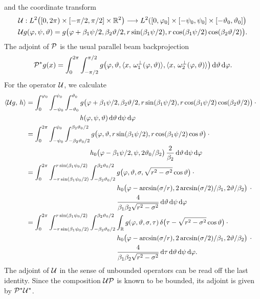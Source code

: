 \documentclass{amsart}
\renewcommand*{\phi}{\varphi}
\begin{document}
%
and the coordinate transform
%
\begin{align}
 &\OPU: L^2\big( [0, 2\pi) \times [-\pi/2, \pi/2] \times \RR^2 \big) \Lto L^2([0, \phi_0] \times [-\psi_0, \psi_0] \times 
 [-\vartheta_0, \vartheta_0] \big) \notag \\
 \label{eq:conecurved_coord_op}
 &\OPU g(\phi, \psi, \vartheta) = g\big( \phi + \beta_1\psi/2, \beta_2\vartheta/2, r\sin(\beta_1\psi/2), r \cos(\beta_1\psi/2) 
 \cos(\beta_2\vartheta/2) \big).
\end{align}
%
The adjoint of ${\mathcal{P}}$ is the usual parallel beam backprojection
%
\begin{equation}
 \label{eq:conecurved_backproj}
 \DUALOPP g(x) = \int_0^{2\pi} \int_{-\pi/2}^{\pi/2} g\big( \phi, \vartheta, \INNER{x}{\omega_1^\perp(\phi, \vartheta)}, 
 \INNER{x}{\omega_2^\perp(\phi, \vartheta)} \big)\, \D\vartheta\, \D\phi.
\end{equation} 
%
For the operator ${\mathcal{U}}$, we calculate
%
\begin{align*}
 \INNER{\OPU g}{h}
 &= \int_0^{\phi_0} \int_{-\psi_0}^{\psi_0} \int_{-\vartheta_0}^{\vartheta_0} g\big( \phi + \beta_1\psi/2, \beta_2\vartheta/2, 
 r\sin(\beta_1\psi/2), r \cos(\beta_1\psi/2) \cos(\beta_2\vartheta/2) \big) \cdot \phantom{x} \\
 &\hspace{80pt} h(\phi, \psi, \vartheta)\, \D\vartheta\, \D\psi\, \D\phi \\
 &= \int_0^{2\pi} \int_{-\psi_0}^{\psi_0} \int_{-\beta_2\vartheta_0/2}^{\beta_2\vartheta_0/2} g\big( \phi, \vartheta, 
 r\sin(\beta_1\psi/2), r \cos(\beta_1\psi/2) \cos\vartheta \big) \cdot \phantom{x} \\
 &\hspace{95pt} h_0\big( \phi - \beta_1\psi/2, \psi, 2\vartheta_0/\beta_2 \big)\, 
 \frac{2}{\beta_2}\, \D\vartheta\, \D\psi\, \D\phi \\
 &= \int_0^{2\pi} \int_{-r\sin(\beta_1\psi_0/2)}^{r\sin(\beta_1\psi_0/2)} \int_{-\beta_2\vartheta_0/2}^{\beta_2\vartheta_0/2}
 g\big( \phi, \vartheta, \sigma, \sqrt{r^2 - \sigma^2} \cos\vartheta \big) \cdot \phantom{x} \\
 &\hspace{135pt} h_0\big( \phi - \arcsin(\sigma/r), 2\arcsin(\sigma/2)/\beta_1, 2\vartheta/\beta_2 \big)\, \cdot \phantom{x} \\
 &\hspace{135pt} \frac{4}{\beta_1\beta_2\sqrt{r^2 - \sigma^2}}\, \D\vartheta\, \D\psi\, \D\phi \\
 &= \int_0^{2\pi} \int_{-r\sin(\beta_1\psi_0/2)}^{r\sin(\beta_1\psi_0/2)} \int_{-\beta_2\vartheta_0/2}^{\beta_2\vartheta_0/2} \int_\RR
 g(\phi, \vartheta, \sigma, \tau)\, \delta\big(\tau - \sqrt{r^2 - \sigma^2} \cos\vartheta \big) \cdot \phantom{x} \\
 &\hspace{135pt} h_0\big( \phi - \arcsin(\sigma/r), 2\arcsin(\sigma/2)/\beta_1, 2\vartheta/\beta_2 \big)\, \cdot \phantom{x} \\
 &\hspace{135pt} \frac{4}{\beta_1\beta_2\sqrt{r^2 - \sigma^2}}\, \D\tau\, \D\vartheta\, \D\psi\, \D\phi.
\end{align*}
%
The adjoint of ${\mathcal{U}}$ in the sense of unbounded operators can be read off the last identity. Since the composition ${\mathcal{U}} {\mathcal{P}}$ is known to 
be bounded, its adjoint is given by ${{\mathcal{P}}^*} {{\mathcal{U}}^*}$.
%
\end{document}
